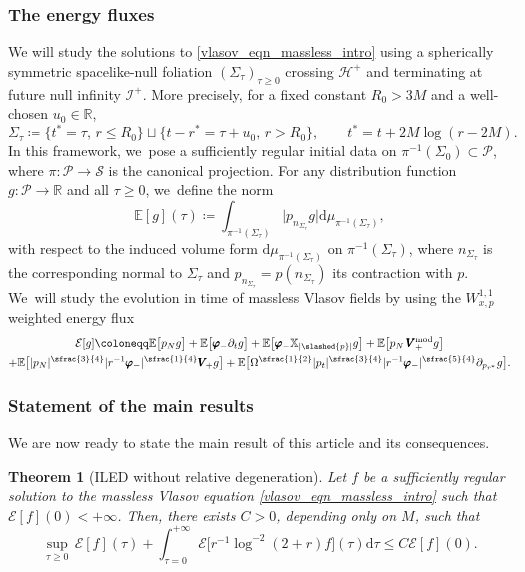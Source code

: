 \documentclass[10pt]{amsart}
\theoremstyle{plain}
\newtheorem{theorem}{Theorem}[section]
\theoremstyle{definition}
\newcommand\R{{\mathbb{R}}}
\newcommand\T{{\mathbb{X}}}
\renewcommand\H{{\mathcal{H}^+}}
\newcommand\dr{{\mathrm{d}}}
\begin{document}
\subsubsection{The energy fluxes}

We will study the solutions to \eqref{vlasov_eqn_massless_intro} using a spherically symmetric spacelike-null foliation $(\Sigma_\tau)_{\tau \geq 0}$ crossing $\H$ and terminating at future null infinity $\mathcal{I}^+$. More precisely, for a fixed constant $R_0 >3M$ and a well-chosen $u_0 \in \R$,
\[
\Sigma_\tau \coloneqq \bigl\{ t^* = \tau, \, r \leq R_0 \bigr\} \sqcup \bigl\{ t-r^*=\tau+u_0, \, r > R_0 \bigr\},\qquad t^*=t+2M\log (r-2M).
\]
In this framework, we~pose a sufficiently regular initial data on $\pi^{-1}(\Sigma_0) \subset \mathcal{P}$, where $\pi\colon \mathcal{P}\to \mathcal{S}$ is the canonical projection. For any distribution function $g : \mathcal{P} \to \R$ and all $\tau \geq 0$, we~define the norm
\[
\mathbb{E} [g](\tau) \coloneqq \int_{\pi^{-1}(\Sigma_\tau)} \big| p_{n_{\Sigma_\tau}} g \big| \dr \mu_{\pi^{-1}(\Sigma_\tau)},
\]
with respect to the induced volume form $\dr \mu_{\pi^{-1}(\Sigma_\tau)}$ on $\pi^{-1}(\Sigma_\tau)$, where $n_{\Sigma_\tau}$ is the corresponding normal to $\Sigma_\tau$ and $p_{n_{\Sigma_\tau}}=p(n_{\Sigma_\tau})$ its contraction with $p$. We~will study the evolution in time of massless Vlasov fields by using the $W^{1,1}_{x,p}$ weighted energy flux
\begin{multline*}
\mathcal{E}[g]\coloneqq \mathbb{E} \bigl[ p_N g \bigr]+\mathbb{E} \bigl[ \pmb{\varphi}_- \partial_t g \bigr] +\mathbb{E} \bigl[ \pmb{\varphi}_- \T_{|\slashed{p}|} g \bigr] + \mathbb{E} \bigl[ p_N \, \pmb{V}_+^{ \mathrm{mod}} g \bigr] \\
 +\mathbb{E} \bigl[ |p_N|^{\sfrac{3}{4}} |r^{-1} \pmb{\varphi}_-|^{\sfrac{1}{4}} \pmb{V}_{\! +} g \bigr] +\mathbb{E} \bigl[\Omega^{\sfrac{1}{2}}|p_t|^{\sfrac{3}{4}} |r^{-1} \pmb{\varphi}_-|^{\sfrac{5}{4}} \partial_{p_{r^*}} g \bigr].
\end{multline*}

\subsubsection{Statement of the main results}

We are now ready to state the main result of this article and its consequences.


\begin{theorem}[ILED without relative degeneration]\label{thm_main_intro}
Let $f $ be a sufficiently regular solution to the massless Vlasov equation \eqref{vlasov_eqn_massless_intro} such that $\mathcal{E}[f](0) <+\infty$. Then, there exists $C>0$, depending only on $M$, such that
\[
\sup_{\tau \geq 0} \, \mathcal{E}[f](\tau) +\int_{\tau=0}^{+\infty} \mathcal{E}\bigl[r^{-1} \log^{-2}(2+r)f \bigr](\tau) \dr \tau \leq C \mathcal{E}[f](0).
\]
\end{theorem}
\end{document}
